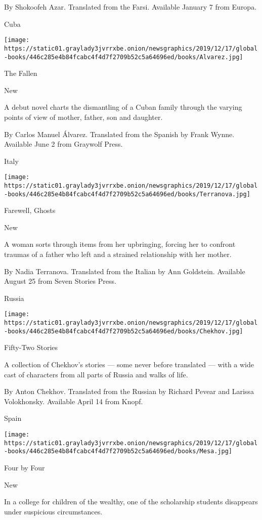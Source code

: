  By Shokoofeh Azar. Translated from the Farsi. Available January 7 from
Europa.

Cuba

\texttt{[image: https://static01.graylady3jvrrxbe.onion/newsgraphics/2019/12/17/global-books/446c285e4b84fcabc4f4d7f2709b52c5a64696ed/books/Alvarez.jpg]}

The Fallen

New

A debut novel charts the dismantling of a Cuban family through the
varying points of view of mother, father, son and daughter.

 By Carlos Manuel Álvarez. Translated from the Spanish by Frank Wynne.
Available June 2 from Graywolf Press.

Italy

\texttt{[image: https://static01.graylady3jvrrxbe.onion/newsgraphics/2019/12/17/global-books/446c285e4b84fcabc4f4d7f2709b52c5a64696ed/books/Terranova.jpg]}

Farewell, Ghosts

New

A woman sorts through items from her upbringing, forcing her to confront
traumas of a father who left and a strained relationship with her
mother.

 By Nadia Terranova. Translated from the Italian by Ann Goldstein.
Available August 25 from Seven Stories Press.

Russia

\texttt{[image: https://static01.graylady3jvrrxbe.onion/newsgraphics/2019/12/17/global-books/446c285e4b84fcabc4f4d7f2709b52c5a64696ed/books/Chekhov.jpg]}

Fifty-Two Stories

A collection of Chekhov's stories --- some never before translated ---
with a wide cast of characters from all parts of Russia and walks of
life.

 By Anton Chekhov. Translated from the Russian by Richard Pevear and
Larissa Volokhonsky. Available April 14 from Knopf.

Spain

\texttt{[image: https://static01.graylady3jvrrxbe.onion/newsgraphics/2019/12/17/global-books/446c285e4b84fcabc4f4d7f2709b52c5a64696ed/books/Mesa.jpg]}

Four by Four

New

In a college for children of the wealthy, one of the scholarship
students disappears under suspicious circumstances.

